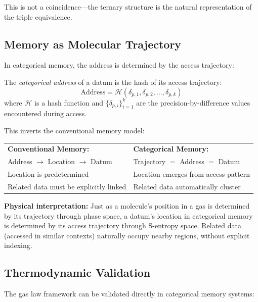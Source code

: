 This is not a coincidence—the ternary structure is the natural representation of the triple equivalence.



\subsection{Memory as Molecular Trajectory}

In categorical memory, the address is determined by the access trajectory:

\begin{definition}
\label{def:categorical_address}
The \textit{categorical address} of a datum is the hash of its access trajectory:
\begin{equation}
\text{Address} = \mathcal{H}(\delta_{p,1}, \delta_{p,2}, \ldots, \delta_{p,k})
\end{equation}
where $\mathcal{H}$ is a hash function and $\{\delta_{p,i}\}_{i=1}^k$ are the precision-by-difference values encountered during access.
\end{definition}

This inverts the conventional memory model:

\begin{center}
\begin{tabular}{p{6cm}p{6cm}}
\textbf{Conventional Memory:} & \textbf{Categorical Memory:} \\
Address $\to$ Location $\to$ Datum & Trajectory $=$ Address $=$ Datum \\
Location is predetermined & Location emerges from access pattern \\
Related data must be explicitly linked & Related data automatically cluster \\
\end{tabular}
\end{center}

\textbf{Physical interpretation:} Just as a molecule's position in a gas is determined by its trajectory through phase space, a datum's location in categorical memory is determined by its access trajectory through S-entropy space. Related data (accessed in similar contexts) naturally occupy nearby regions, without explicit indexing.
\subsection{Thermodynamic Validation}

The gas law framework can be validated directly in categorical memory systems:


